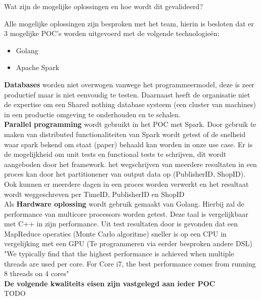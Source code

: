 Wat zijn de mogelijke oplossingen en hoe wordt dit gevalideerd?

Alle mogelijke oplossingen zijn besproken met het team, hierin is besloten dat er 3 mogelijke POC's worden uitgevoerd met de volgende technologieën:

\begin{itemize}
    \item Golang
    \item Apache Spark
\end{itemize}

\textbf{Databases} worden niet overwogen vanwege het programmeermodel, deze is zeer productief maar is niet eenvoudig te testen. Daarnaast heeft de organisatie niet de expertise om een Shared nothing database systeem (een cluster van machines) in een productie omgeving te onderhouden en te schalen. \\

\textbf{Parallel programming} wordt gebruikt in het POC met Spark. Door gebruik te maken van distributed functionaliteiten van Spark wordt getest of de snelheid waar spark bekend om staat (paper) behaald kan worden in onze use case. Er is de mogelijkheid om unit tests en functional tests te schrijven, dit wordt aangeboden door het framework.
het wegschrijven van meerdere resultaten in een proces kan door het partitionener van output data op (PublisherID, ShopID). Ook kunnen er meerdere dagen in een proces worden verwerkt en het resultaat wordt weggeschreven per TimeID, PublisherID en ShopID
\\

Als \textbf{Hardware oplossing} wordt gebruik gemaakt van Golang. Hierbij zal de performance van multicore processors worden getest. Deze taal is vergelijkbaar met C++ in zijn performance. Uit test resultaten door \cite{lee2010debunking} is gevonden dat een MapReduce operaties (Monte Carlo algoritme) sneller is op een CPU in vergelijking met een GPU (Te programmeren via eerder besproken andere DSL) "We typically find that the highest performance is achieved when multiple threads are used per core. For Core i7, the best performance comes from running 8 threads on 4 cores" \parencite{lee2010debunking} \\

\textbf{De volgende kwaliteits eisen zijn vastgelegd aan ieder POC} \\

TODO


